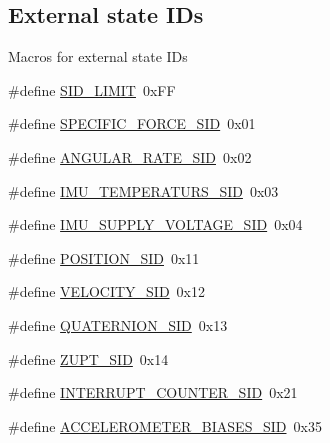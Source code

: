 \subsection*{\-External state \-I\-Ds}
\label{_amgrpd4b29b39767bb9a4ca484ce162256199}%
 \-Macros for external state \-I\-Ds \begin{DoxyCompactItemize}
\item 
\#define \hyperlink{group__control__tables_gaeadb9947c80d097da4413c55179afe6f}{\-S\-I\-D\-\_\-\-L\-I\-M\-I\-T}~0x\-F\-F
\item 
\#define \hyperlink{group__control__tables_gae04e393e8b250dad55fddb546ef61111}{\-S\-P\-E\-C\-I\-F\-I\-C\-\_\-\-F\-O\-R\-C\-E\-\_\-\-S\-I\-D}~0x01
\item 
\#define \hyperlink{group__control__tables_ga4bae6e7de487043575d61cb52dff4cf3}{\-A\-N\-G\-U\-L\-A\-R\-\_\-\-R\-A\-T\-E\-\_\-\-S\-I\-D}~0x02
\item 
\#define \hyperlink{group__control__tables_gad5186a188194306bbc87ddddc7644ddd}{\-I\-M\-U\-\_\-\-T\-E\-M\-P\-E\-R\-A\-T\-U\-R\-S\-\_\-\-S\-I\-D}~0x03
\item 
\#define \hyperlink{group__control__tables_gad0a37f572243f76ea1f2b79fc14b2a30}{\-I\-M\-U\-\_\-\-S\-U\-P\-P\-L\-Y\-\_\-\-V\-O\-L\-T\-A\-G\-E\-\_\-\-S\-I\-D}~0x04
\item 
\#define \hyperlink{group__control__tables_gaafd3e23709eecfd5bfdc358f8a07b991}{\-P\-O\-S\-I\-T\-I\-O\-N\-\_\-\-S\-I\-D}~0x11
\item 
\#define \hyperlink{group__control__tables_ga6b3256a3e116aaefe13352f9b493c279}{\-V\-E\-L\-O\-C\-I\-T\-Y\-\_\-\-S\-I\-D}~0x12
\item 
\#define \hyperlink{group__control__tables_gae1fc29b0358f36a68b7ba9bde85e16fd}{\-Q\-U\-A\-T\-E\-R\-N\-I\-O\-N\-\_\-\-S\-I\-D}~0x13
\item 
\#define \hyperlink{group__control__tables_ga1c2e91b10f17814f52bf09f647909d83}{\-Z\-U\-P\-T\-\_\-\-S\-I\-D}~0x14
\item 
\#define \hyperlink{group__control__tables_gab3382d5f9c6e647fc9b795596dd14646}{\-I\-N\-T\-E\-R\-R\-U\-P\-T\-\_\-\-C\-O\-U\-N\-T\-E\-R\-\_\-\-S\-I\-D}~0x21
\item 
\#define \hyperlink{group__control__tables_gaf0c693bf22229a5eba03b2bad37b07bf}{\-A\-C\-C\-E\-L\-E\-R\-O\-M\-E\-T\-E\-R\-\_\-\-B\-I\-A\-S\-E\-S\-\_\-\-S\-I\-D}~0x35
\end{DoxyCompactItemize}
